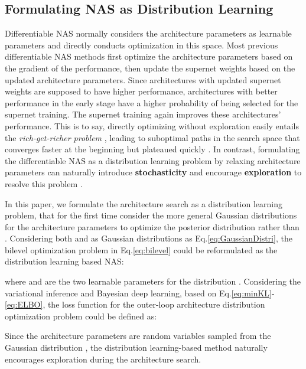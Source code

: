 \documentclass[10pt,twocolumn,letterpaper]{article}
\begin{document}
\subsection{Formulating NAS as Distribution Learning}

Differentiable NAS normally considers the architecture parameters  as learnable parameters and directly conducts optimization in this space. Most previous differentiable NAS methods first optimize the architecture parameters based on the gradient of the performance, then update the supernet weights based on the updated architecture parameters. Since architectures with updated supernet weights are supposed to have higher performance, architectures with better performance in the early stage have a higher probability of being selected for the supernet training. The supernet training again improves these architectures' performance. This is to say, directly optimizing  without exploration easily entails the \textit{rich-get-richer  problem} \cite{li2019improving,zhang2020one}, leading to suboptimal paths in the search space that converges faster at the beginning but plateaued quickly \cite{shu2019understanding,chen2020drnas}. In contrast, formulating the differentiable NAS as a distribution learning problem by relaxing architecture parameters can naturally introduce \textbf{stochasticity} and encourage \textbf{exploration} to resolve this problem \cite{chen2020drnas,chen2020stabilizing}.


In this paper, we formulate the architecture search as a distribution learning problem, that for the first time consider the more general Gaussian distributions for the architecture parameters to optimize the posterior distribution  rather than . Considering both  and  as Gaussian distributions as Eq.\eqref{eq:GaussianDistri}, the bilevel optimization problem in Eq.\eqref{eq:bilevel} could be reformulated as the distribution learning based NAS:

where  and  are the two learnable parameters for the distribution . Considering the variational inference and Bayesian deep learning, based on Eq.\eqref{eq:minKL}-\eqref{eq:ELBO}, the loss function for the outer-loop architecture distribution optimization problem could be defined as:

Since the architecture parameters  are random variables sampled from the Gaussian distribution , the distribution learning-based method naturally encourages exploration during the architecture search.
\end{document}
